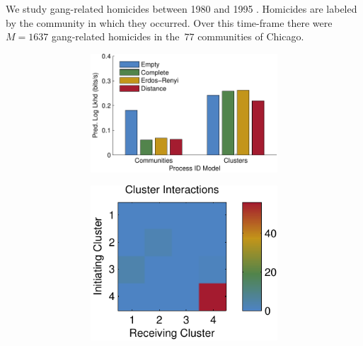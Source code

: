 We study gang-related homicides between 1980 and 1995
\citep{ICPSR}. Homicides are labeled by the community in which they
occurred. Over this time-frame there were~${M=1637}$ gang-related
homicides in the~${77}$ communities of Chicago.

\begin{figure}[!t]
  \begin{center}
    \begin{subfigure}[T]{.32\textwidth}
      \begin{subfigure}[T]{\textwidth}
        \begin{center}
          \caption{}
          \includegraphics[width=\linewidth]{figures/ch3/icpsr_pred_ll}
          \label{fig:chicago_predll}
        \end{center}
      \end{subfigure}
      \begin{subfigure}[B]{\textwidth}
        \vspace{1em}
        \begin{center}
          \caption{}
          \includegraphics[width=.7\linewidth]{figures/ch3/icpsr_interactions}\\

\end{center}
\end{subfigure}
\end{subfigure}
\end{center}
\end{figure}
